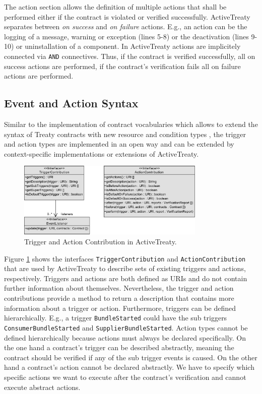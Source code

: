 \documentclass{llncs}
\begin{document}
The action section allows the definition of multiple actions that shall be performed either if the contract is violated or verified successfully. ActiveTreaty separates between \textit{on success} and \textit{on failure} actions. E.g., an action can be the logging of a message, warning or exception (lines 5-8) or the deactivation (lines 9-10) or uninstallation of a component. In ActiveTreaty actions are implicitely connected via \texttt{AND} connectives. Thus, if the contract is verified successfully, all on success actions are performed, if the contract's verification fails all on failure actions are performed.
	


\subsection{Event and Action Syntax} 

Similar to the implementation of contract vocabularies which allows to extend the syntax of Treaty contracts with new resource and condition types \cite{Treaty.JOT2009}, the trigger and action types are implemented in an open way and can be extended by context-specific implementations or extensions of ActiveTreaty.

\begin{figure}[htbp]
  \centering
  \includegraphics[width=0.8\textwidth]{ContributorModel1.pdf}
  \caption{Trigger and Action Contribution in ActiveTreaty.}
  \label{fig:contribution}
\end{figure}

Figure \ref{fig:contribution} shows the interfaces \texttt{TriggerContribution} and \texttt{Action\-Con\-tri\-bu\-tion} that are used by ActiveTreaty to describe sets of existing triggers and actions, respectively. Triggers and actions are both defined as URIs and do not contain further information about themselves. Nevertheless, the trigger and action contributions provide a method to return a description that contains more information about a trigger or action. Furthermore, triggers can be defined hierarchically. E.g., a trigger \texttt{BundleStarted} could have the sub triggers \texttt{ConsumerBundleStarted} and \texttt{SupplierBundleStarted}. Action types cannot be defined hierarchically because actions must always be declared specifically. On the one hand a contract's trigger can be described abstractly, meaning the contract should be verified if any of the sub trigger events is caused. On the other hand a contract's action cannot be declared abstractly. We have to specify which specific actions we want to execute after the contract's verification and cannot execute abstract actions.
\end{document}
